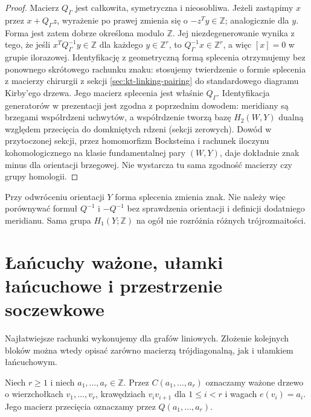 \begin{proof}
Macierz $Q_\Gamma$ jest całkowita, symetryczna i nieosobliwa.
Jeżeli zastąpimy $x$ przez $x+Q_\Gamma z$, wyrażenie po prawej
zmienia się o $-z^Ty\in\mathbb Z$; analogicznie dla $y$.
Forma jest zatem dobrze określona modulo $\mathbb Z$.
Jej niezdegenerowanie wynika z tego, że jeśli
$x^TQ_\Gamma^{-1}y\in\mathbb Z$ dla każdego $y\in\mathbb Z^r$,
to $Q_\Gamma^{-1}x\in\mathbb Z^r$, a więc
$[x]=0$ w grupie ilorazowej. Identyfikację z geometryczną formą splecenia
otrzymujemy bez ponownego skrótowego rachunku
znaku: stosujemy twierdzenie o formie splecenia
z macierzy chirurgii z sekcji
\ref{sec:kt-linking-pairing} do standardowego
diagramu Kirby'ego drzewa. Jego macierz
splecenia jest właśnie $Q_\Gamma$.
Identyfikacja generatorów w prezentacji jest
zgodna z poprzednim dowodem: meridiany są
brzegami współrdzeni uchwytów, a współrdzenie
tworzą bazę $H_2(W,Y)$ dualną względem
przecięcia do domkniętych rdzeni (sekcji
zerowych). Dowód w przytoczonej sekcji,
przez homomorfizm Bocksteina i rachunek
iloczynu kohomologicznego na klasie
fundamentalnej pary $(W,Y)$, daje dokładnie
znak minus dla orientacji brzegowej.
Nie wystarcza tu sama zgodność macierzy
czy grupy homologii.
\end{proof}

\begin{uwaga}
Przy odwróceniu orientacji $Y$ forma splecenia zmienia znak.
Nie należy więc porównywać formuł $Q^{-1}$ i $-Q^{-1}$
bez sprawdzenia orientacji i definicji dodatniego meridianu.
Sama grupa $H_1(Y;\mathbb Z)$ na ogół nie rozróżnia
różnych trójrozmaitości.
\end{uwaga}

\section{Łańcuchy ważone, ułamki łańcuchowe i przestrzenie soczewkowe}
\label{sec:tg-plumbing-chains}

Najłatwiejsze rachunki wykonujemy dla grafów liniowych.
Złożenie kolejnych bloków można wtedy opisać zarówno
macierzą trójdiagonalną, jak i ułamkiem łańcuchowym.

\begin{definicja}
Niech $r\ge1$ i niech $a_1,\dots,a_r\in\mathbb Z$.
Przez $C(a_1,\dots,a_r)$ oznaczamy ważone drzewo o
wierzchołkach $v_1,\dots,v_r$, krawędziach
$v_iv_{i+1}$ dla $1\le i<r$ i wagach $e(v_i)=a_i$.
Jego macierz przecięcia oznaczamy przez $Q(a_1,\dots,a_r)$.
\end{definicja}

